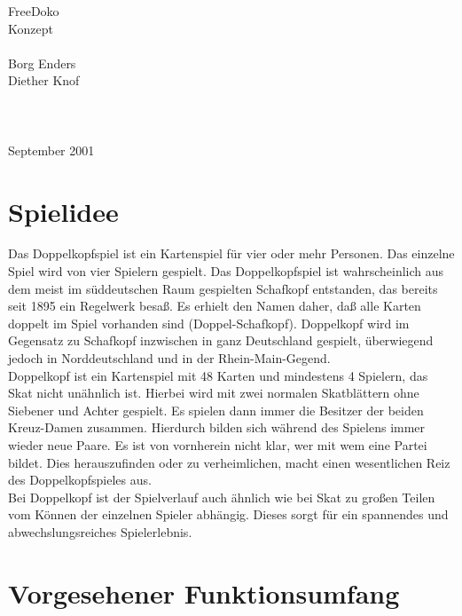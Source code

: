 \documentclass[12pt,a4paper]{article}
\begin{document}
\thispagestyle{empty}
\begin{center}
\linespread{2.0}
{\Huge
FreeDoko
\ \\
\vspace{2cm}
Konzept
\ \\
\vspace{2cm}
}
{\large
\ \\
\vspace{2cm}
Borg Enders\\
Diether Knof
\ \\
\vspace{2cm}
\ \\
}
\ \\
\vspace{2cm}
\ \\
September 2001
\end{center}
\newpage
\tableofcontents \newpage
\section{Spielidee}
Das Doppelkopfspiel ist ein Kartenspiel für vier oder mehr Personen.
Das einzelne Spiel wird von vier Spielern gespielt. Das Doppelkopfspiel ist
wahrscheinlich aus dem meist im süddeutschen Raum gespielten Schafkopf entstanden, das bereits seit 1895 ein Regelwerk
besaß. Es erhielt den Namen daher, daß alle Karten doppelt im Spiel vorhanden sind (Doppel-Schafkopf).
Doppelkopf wird im Gegensatz zu Schafkopf inzwischen in ganz Deutschland gespielt, überwiegend jedoch in Norddeutschland
und in der Rhein-Main-Gegend.\\
Doppelkopf ist ein Kartenspiel mit 48 Karten und mindestens 4 Spielern, das Skat nicht unähnlich ist. Hierbei wird mit zwei
normalen Skatblättern ohne Siebener und Achter gespielt. Es spielen dann immer die Besitzer der beiden Kreuz-Damen zusammen.
Hierdurch bilden sich während des Spielens immer wieder neue Paare. Es ist von vornherein nicht klar, wer mit wem eine Partei bildet.
Dies herauszufinden oder zu verheimlichen, macht einen wesentlichen Reiz des Doppelkopfspieles aus.\\
Bei Doppelkopf ist der Spielverlauf auch ähnlich wie bei Skat zu großen Teilen vom Können der einzelnen Spieler abhängig.
Dieses sorgt für ein spannendes und abwechslungsreiches Spielerlebnis.
\newpage
\section{Vorgesehener Funktionsumfang}
\end{document}
